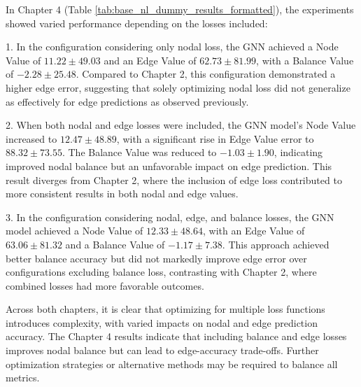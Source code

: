 In Chapter 4 (Table \ref{tab:base_nl_dummy_results_formatted}), the experiments showed varied performance depending on the losses included:

1. In the configuration considering only nodal loss, the GNN achieved a Node Value of \(11.22 \pm 49.03\) and an Edge Value of \(62.73 \pm 81.99\), with a Balance Value of \(-2.28 \pm 25.48\). Compared to Chapter 2, this configuration demonstrated a higher edge error, suggesting that solely optimizing nodal loss did not generalize as effectively for edge predictions as observed previously.

2. When both nodal and edge losses were included, the GNN model’s Node Value increased to \(12.47 \pm 48.89\), with a significant rise in Edge Value error to \(88.32 \pm 73.55\). The Balance Value was reduced to \(-1.03 \pm 1.90\), indicating improved nodal balance but an unfavorable impact on edge prediction. This result diverges from Chapter 2, where the inclusion of edge loss contributed to more consistent results in both nodal and edge values.

3. In the configuration considering nodal, edge, and balance losses, the GNN model achieved a Node Value of \(12.33 \pm 48.64\), with an Edge Value of \(63.06 \pm 81.32\) and a Balance Value of \(-1.17 \pm 7.38\). This approach achieved better balance accuracy but did not markedly improve edge error over configurations excluding balance loss, contrasting with Chapter 2, where combined losses had more favorable outcomes.

Across both chapters, it is clear that optimizing for multiple loss functions introduces complexity, with varied impacts on nodal and edge prediction accuracy. The Chapter 4 results indicate that including balance and edge losses improves nodal balance but can lead to edge-accuracy trade-offs. Further optimization strategies or alternative methods may be required to balance all metrics.

